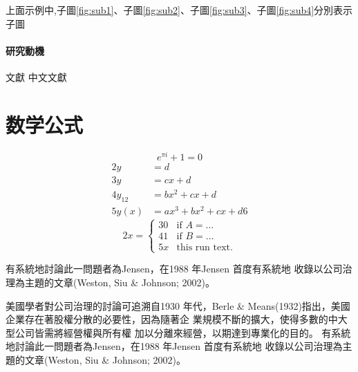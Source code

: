 \documentclass[
    添加扉页=是,
    添加原創聲明頁=是,
    添加校徽水印=是,
    奇偶页邊距對稱=不,
]{.def/must}
\begin{document}
上面示例中,子圖\ref{fig:sub1}、子圖\ref{fig:sub2}、子圖\ref{fig:sub3}、子圖\ref{fig:sub4}分別表示子圖








\subsubsection{研究動機}
文獻\cite{article,book,cho,chapter,conference,patent}
中文文獻\cite{cnarticle,cnbook,cncho,cnchapter,cnconference,cnpatent}







 
\chapter{数学公式}
\begin{equation}
\label{eq1}
e^{\pi i}+1=0
\end{equation}
\begin{align}
2 y & =d\label{eq:IntoSection}\\
3 y & =cx+d\\
4 y_{12} & =bx^{2}+cx+d\\
5 y(x) & =ax^{3}+bx^{2}+cx+d
6 
\end{align}
\begin{equation}
2 x=\left\{ \begin{array}{cl}
3 0 & \textrm{if }A=\ldots\\
4 1 & \textrm{if }B=\ldots\\
5 x & \textrm{this run  text.}\end
{array}\right.
\end{equation}        



有系統\cite{article}地討論此一問題者為Jensen，在1988 年Jensen 首度有系統地
收錄以公司治理為主題的文章(Weston, Siu \& Johnson; 2002)。

美國學者對公司治理的討論可追溯自1930 年代，Berle \&
Means(1932)指出，美國企業存在著股權分散的必要性，因為隨著企
業規模不斷的擴大，使得多數的中大型公司皆需將經營權與所有權
加以分離來經營，以期達到專業化的目的。
有系統地討論此一問題者為Jensen，在1988 年Jensen 首度有系統地
收錄以公司治理為主題的文章(Weston, Siu \& Johnson; 2002)。
\end{document}
